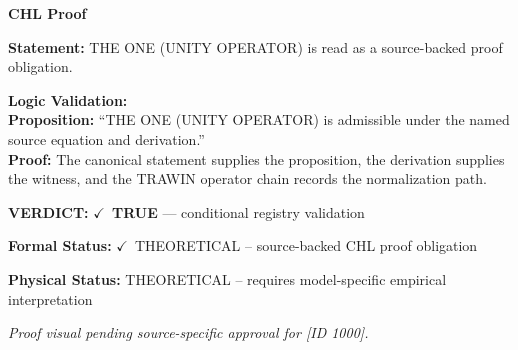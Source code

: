 \vspace{0.45em}
\noindent\textbf{CHL Proof}\par
\textbf{Statement:} THE ONE (UNITY OPERATOR) is read as a source-backed proof obligation.

\textbf{Logic Validation:}\\
\textbf{Proposition:} ``THE ONE (UNITY OPERATOR) is admissible under the named source equation and derivation.''\\
\textbf{Proof:} The canonical statement supplies the proposition, the derivation supplies the witness, and the TRAWIN operator chain records the normalization path.

\textbf{VERDICT:} \ensuremath{\checkmark}\ \textbf{TRUE} --- conditional registry validation

\textbf{Formal Status:} \ensuremath{\checkmark}\ THEORETICAL -- source-backed CHL proof obligation

\textbf{Physical Status:} THEORETICAL -- requires model-specific empirical interpretation
\par\vspace{0.45em}
\par
\vfill
\begingroup\footnotesize\itshape
Proof visual pending source-specific approval for [ID 1000].
\par\endgroup
\vfill
\endgroup
\endgroup

